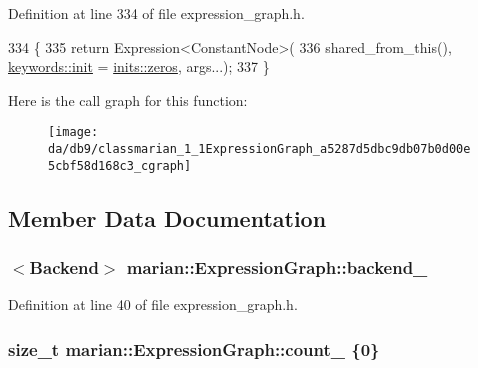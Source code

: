 Definition at line 334 of file expression\+\_\+graph.\+h.


\begin{DoxyCode}
334                            \{
335     \textcolor{keywordflow}{return} Expression<ConstantNode>(
336         shared\_from\_this(), \hyperlink{namespacemarian_1_1keywords_afdd3807e3d6fe2bc979d11fa0cf3ee3e}{keywords::init} = \hyperlink{namespacemarian_1_1inits_a1bd34fd256e3df7bb1e27955a7f2b359}{inits::zeros}, args...);
337   \}
\end{DoxyCode}


Here is the call graph for this function\+:
\nopagebreak
\begin{figure}[H]
\begin{center}
\leavevmode
\texttt{[image: da/db9/classmarian\_1\_1ExpressionGraph\_a5287d5dbc9db07b0d00e5cbf58d168c3\_cgraph]}
\end{center}
\end{figure}




\subsection{Member Data Documentation}
\subsubsection[{\texorpdfstring{backend\+\_\+}{backend_}}]{$<${\bf Backend}$>$ marian\+::\+Expression\+Graph\+::backend\+\_\+\hspace{0.3cm}{\ttfamily [private]}}\hypertarget{classmarian_1_1ExpressionGraph_a0f7e6ae1853ea83f5adc80fe3f5b2cb7}{}\label{classmarian_1_1ExpressionGraph_a0f7e6ae1853ea83f5adc80fe3f5b2cb7}


Definition at line 40 of file expression\+\_\+graph.\+h.

\subsubsection[{\texorpdfstring{count\+\_\+}{count_}}]{\setlength{\rightskip}{0pt plus 5cm}size\+\_\+t marian\+::\+Expression\+Graph\+::count\+\_\+ \{0\}\hspace{0.3cm}{\ttfamily [private]}}\hypertarget{classmarian_1_1ExpressionGraph_af46afb7a2ba6ef751c927ccf98276b57}{}\label{classmarian_1_1ExpressionGraph_af46afb7a2ba6ef751c927ccf98276b57}


